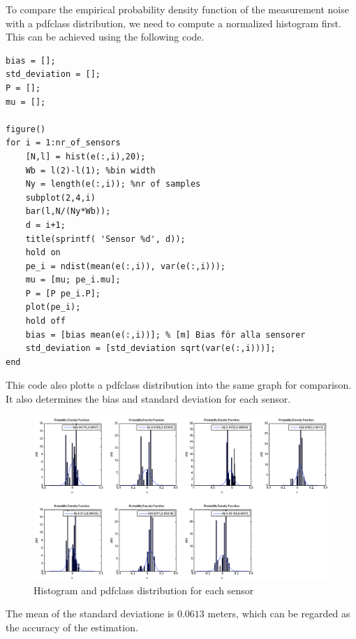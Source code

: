 \documentclass[10pt,a4paper]{report}
\begin{document}
To compare the empirical probability density function of the measurement noise with a pdfclass distribution, we need to compute a normalized histogram first. This can be achieved using the following code.
\begin{verbatim}
bias = [];
std_deviation = [];
P = [];
mu = [];

figure()
for i = 1:nr_of_sensors
    [N,l] = hist(e(:,i),20);
    Wb = l(2)-l(1); %bin width
    Ny = length(e(:,i)); %nr of samples
    subplot(2,4,i)
    bar(l,N/(Ny*Wb));
    d = i+1;
    title(sprintf( 'Sensor %d', d));
    hold on
    pe_i = ndist(mean(e(:,i)), var(e(:,i)));
    mu = [mu; pe_i.mu];
    P = [P pe_i.P];
    plot(pe_i);
    hold off
    bias = [bias mean(e(:,i))]; % [m] Bias för alla sensorer
    std_deviation = [std_deviation sqrt(var(e(:,i)))];
end
\end{verbatim}
This code also plotts a pdfclass distribution into the same graph for comparison. It also determines the bias and standard deviation for each sensor. 
\begin{figure}[H]
  \label{histogram}
  \includegraphics[width = 400pt]{histogram.png}
  \caption{Histogram and pdfclass distribution for each sensor}
\end{figure}
The mean of the standard deviatione is $0.0613$ meters, which can be regarded as the accuracy of the estimation.



\newpage
\end{document}

